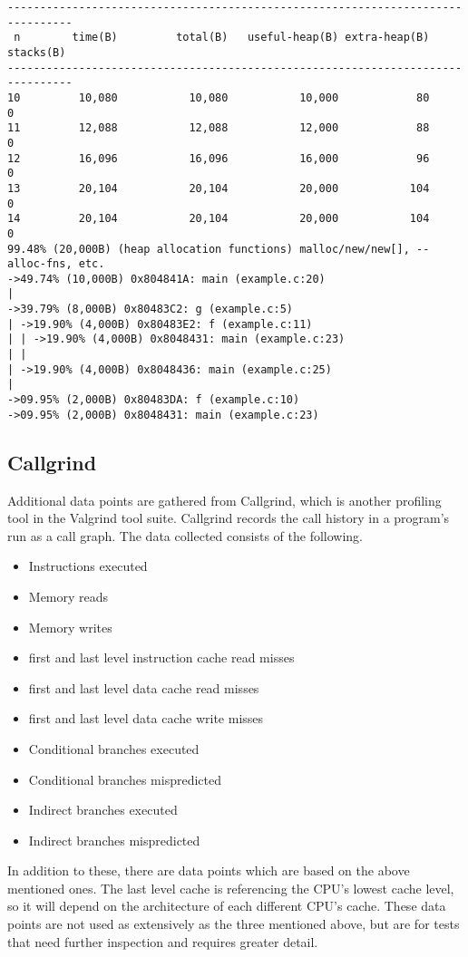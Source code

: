 \begin{lstlisting}[basicstyle=\footnotesize, caption=Massif output example, label=lst:massif_output]
--------------------------------------------------------------------------------
 n        time(B)         total(B)   useful-heap(B) extra-heap(B)    stacks(B)
--------------------------------------------------------------------------------
10         10,080           10,080           10,000            80            0
11         12,088           12,088           12,000            88            0
12         16,096           16,096           16,000            96            0
13         20,104           20,104           20,000           104            0
14         20,104           20,104           20,000           104            0
99.48% (20,000B) (heap allocation functions) malloc/new/new[], --alloc-fns, etc.
->49.74% (10,000B) 0x804841A: main (example.c:20)
| 
->39.79% (8,000B) 0x80483C2: g (example.c:5)
| ->19.90% (4,000B) 0x80483E2: f (example.c:11)
| | ->19.90% (4,000B) 0x8048431: main (example.c:23)
| |   
| ->19.90% (4,000B) 0x8048436: main (example.c:25)
|   
->09.95% (2,000B) 0x80483DA: f (example.c:10)
->09.95% (2,000B) 0x8048431: main (example.c:23)
\end{lstlisting}

\subsection{Callgrind}
Additional data points are gathered from Callgrind, which is another profiling tool in the Valgrind tool suite.
Callgrind records the call history in a program's run as a call graph.
The data collected consists of the following.

\begin{itemize}
	\item Instructions executed
	\item Memory reads
	\item Memory writes
	\item first and last level instruction cache read misses
	\item first and last level data cache read misses
	\item first and last level data cache write misses
	\item Conditional branches executed
	\item Conditional branches mispredicted
	\item Indirect branches executed
	\item Indirect branches mispredicted
\end{itemize}

In addition to these, there are data points which are based on the above mentioned ones.
The last level cache is referencing the CPU's lowest cache level, so it will depend on the architecture of each different CPU's cache.
These data points are not used as extensively as the three mentioned above, but are for tests that need further inspection and requires greater detail.
